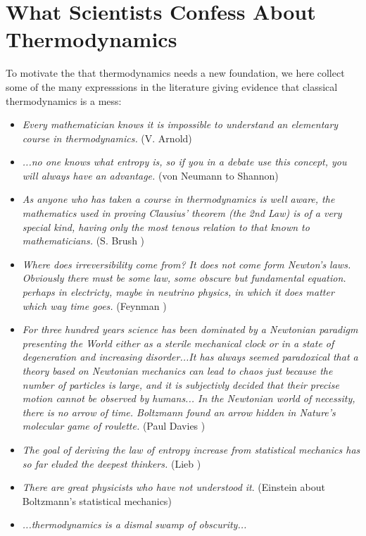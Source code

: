 \chapter{What Scientists Confess About Thermodynamics}

To motivate the that thermodynamics needs a new foundation, we here collect some of the many 
expresssions in the literature giving evidence that classical thermodynamics is a mess:


\begin{itemize}
\item \emph{Every mathematician knows it is impossible to understand
an elementary course in thermodynamics.} (V. Arnold)
\item \emph{...no one knows what entropy is, so if you in a debate use
this concept, you will always have an advantage.} (von Neumann to Shannon)
\item \emph{As anyone who has taken a course in thermodynamics is well aware,
the mathematics used in proving Clausius' theorem (the 2nd Law) is of a very
special kind, having only the most tenous relation to that known to
mathematicians.} (S. Brush \cite{brush})
\item \emph{Where does irreversibility come from? It does not come
form Newton's laws. Obviously there must be some law, some
obscure but fundamental equation. perhaps in electricty,
maybe in neutrino physics, in which it does
matter which way time goes.} (Feynman \cite{feynman})
\item
\emph{For three hundred years science has been dominated by 
a Newtonian paradigm presenting the World either
as a sterile mechanical clock or in a state of degeneration 
and increasing disorder...It has always seemed paradoxical
that a theory based on Newtonian mechanics can lead
to chaos just because the number of particles is large, 
and it is subjectivly decided that their precise motion cannot be 
observed by humans... In the Newtonian world of necessity, there
is no arrow of time. Boltzmann found an arrow hidden in  
Nature's molecular game of roulette.}
(Paul Davies \cite{davies})
\item \emph{The goal of deriving the law of entropy increase
from statistical mechanics has so far eluded the deepest
thinkers.} (Lieb \cite{lieb})
\item \emph{There are great physicists who have not understood it}.
(Einstein about Boltzmann's statistical mechanics) 
\item  \emph{...thermodynamics is a dismal swamp of obscurity...
}
\end{itemize}
